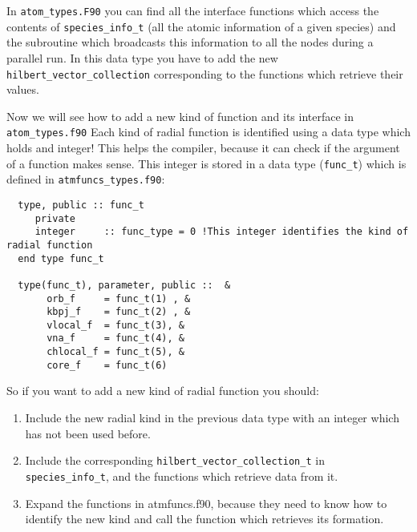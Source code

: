 \documentclass[12pt]{article}
\begin{document}
In \verb|atom_types.F90| you can find all the interface functions which access the contents of 
\verb!species_info_t! (all the atomic information of a given species) and the subroutine which broadcasts this information to all the nodes during a parallel run. In this data
type you have to add the new \verb!hilbert_vector_collection! corresponding to the functions which retrieve their values.

Now we will see how to add a new kind of function and its interface in \verb+atom_types.f90+
Each kind of radial function is identified using a data type which holds and integer! This helps the compiler, because it can check if the argument of a function makes sense. 
This  integer is stored in a data type (\verb!func_t!) which is defined in \verb!atmfuncs_types.f90!: 

\begin{verbatim}
  type, public :: func_t
     private
     integer     :: func_type = 0 !This integer identifies the kind of radial function
  end type func_t

  type(func_t), parameter, public ::  &
       orb_f     = func_t(1) , &
       kbpj_f    = func_t(2) , &
       vlocal_f  = func_t(3), &
       vna_f     = func_t(4), &
       chlocal_f = func_t(5), &
       core_f    = func_t(6)
\end{verbatim}

So if you want to add a new kind of radial function you should:

\begin{enumerate}
\item Include the new radial kind in the previous data type with an integer which has not been used before. 
\item Include the corresponding \verb!hilbert_vector_collection_t! in \verb!species_info_t!, and the functions which retrieve data from it. %

\item Expand the functions in atmfuncs.f90, because they need to know how to identify the new kind  and call the function which retrieves its formation.
\end{enumerate}
\end{document}
